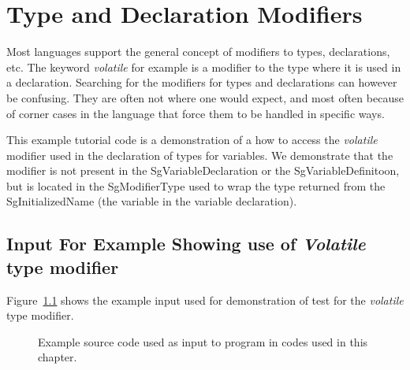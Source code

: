 \chapter{Type and Declaration Modifiers}

   Most languages support the general concept of modifiers to
types, declarations, etc.  The keyword {\em volatile} for
example is a modifier to the type where it is used in a 
declaration.  Searching for the modifiers for types and 
declarations can however be confusing.  They are often not
where one would expect, and most often because of corner
cases in the language that force them to be handled in specific 
ways.

   This example tutorial code is a demonstration of a how to access the
{\em volatile} modifier used in the declaration of types for variables.
We demonstrate that the modifier is not present in the SgVariableDeclaration
or the SgVariableDefinitoon, but is located in the SgModifierType used
to wrap the type returned from the SgInitializedName (the variable in the
variable declaration).

\section{Input For Example Showing use of {\em Volatile} type modifier}

   Figure~\ref{Tutorial:exampleInputCode_volatileTypeModifier}
shows the example input used for demonstration of test for the {\em volatile} 
type modifier.

\begin{figure}[!h]
{\indent
{\mySmallFontSize

\begin{latexonly}
   
\end{latexonly}

\begin{htmlonly}
   
\end{htmlonly}

}
}
\caption{Example source code used as input to program in codes used in this chapter.}
\label{Tutorial:exampleInputCode_volatileTypeModifier}
\end{figure}


